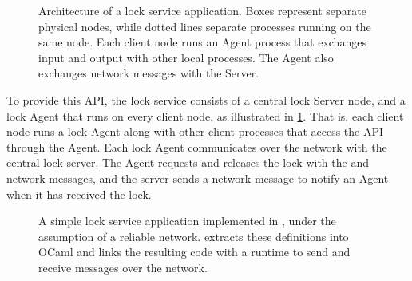 \begin{figure}[t]
  \centering
  

  \caption{Architecture of a lock service application. Boxes represent separate
    physical nodes, while dotted lines separate processes running on
    the same node.  Each client node runs an Agent process that
    exchanges input and output with other local processes.  The Agent
    also exchanges network messages with the Server.}

\label{fig:lock-service-architecture}
\end{figure}

To provide this API, the lock service consists of a central lock Server
node, and a lock Agent that runs on every client node, as illustrated in
\cref{fig:lock-service-architecture}.
%
That is, each client node runs a lock Agent along with other client
processes that access the API through the Agent.
%
Each lock Agent communicates over the network with the central lock server.
%
The Agent requests and releases the lock with the \LockMsg and \UnlockMsg
network messages, and the server sends a \GrantMsg network message to
notify an Agent when it has received the lock.
%


\begin{figure}[p]
\begin{footnotesize}

\end{footnotesize}

\caption{A simple lock service application implemented in \Verdi, under the
  assumption of a reliable network.  \Verdi extracts these definitions into
  OCaml and links the resulting code with a runtime to send and receive
  messages over the network.}
\label{fig:lock-service-code}
\end{figure}

